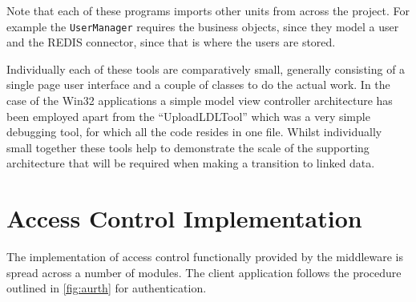 Note that each of these programs imports other units from across the project. For example the \texttt{UserManager} requires the business objects, since they model a user and the REDIS connector, since that is where the users are stored. 

Individually each of these tools are comparatively small, generally consisting of a single page user interface and a couple of classes to do the actual work. In the case of the Win32 applications a simple model view controller architecture has been employed apart from the ``UploadLDLTool'' which was a very simple debugging tool, for which all the code resides in one file. Whilst individually small together these tools help to demonstrate the scale of the supporting architecture that will be required when making a transition to linked data.

\section{Access Control Implementation}

The implementation of access control functionally provided by the middleware is spread across a number of modules. The client application follows the procedure outlined in \autoref{fig:aurth} for authentication.

